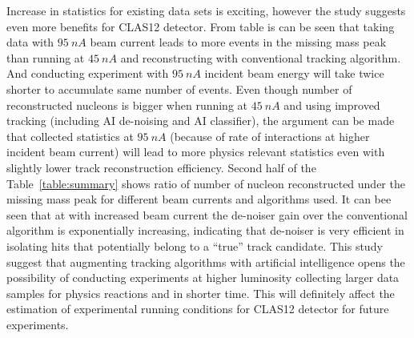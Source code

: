 Increase in statistics for existing data sets is exciting, however the study suggests even more benefits for 
CLAS12 detector.
From table is can be seen that taking data with $95~nA$ beam current leads to more events in the missing 
mass peak than running at $45~nA$ and reconstructing with conventional tracking algorithm. And conducting
experiment with $95~nA$ incident beam energy will take twice shorter to accumulate same number of events.
Even though number of reconstructed nucleons is bigger when running at $45~nA$ and using improved 
tracking (including AI de-noising and AI classifier), the argument can be made that collected statistics at 
$95~nA$ (because of rate of interactions at higher incident beam current) will lead to more physics relevant
statistics even with slightly lower track reconstruction efficiency.
Second half of the Table~\ref{table:summary} shows ratio of number of nucleon reconstructed under the 
missing mass peak for different beam currents and algorithms used. It can bee seen that at with increased 
beam current the de-noiser gain over the conventional algorithm is exponentially increasing, indicating that 
de-noiser is very efficient in isolating hits that potentially belong to a ``true'' track candidate.
This study suggest that augmenting tracking algorithms with artificial intelligence opens the possibility
of conducting experiments at higher luminosity collecting larger data samples for physics reactions and in 
shorter time. This will definitely affect the estimation of experimental running conditions for CLAS12 
detector for future experiments.


